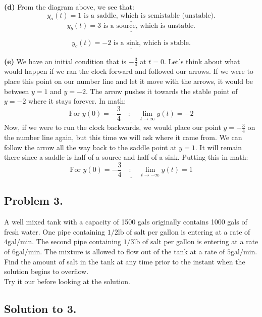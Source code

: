 \documentclass[a4paper,12pt]{article} %
\begin{document}
\textbf{(d)} From the diagram above, we see that:
$$ \underline{\boxed{y_a(t) =1 \text{ is a saddle, which is semistable (unstable).}}} $$
$$ \underline{\boxed{y_b(t) =3 \text{ is a source, which is unstable.}}} $$

$$\underline{\boxed{y_c(t) =-2 \text{ is a sink, which is stable.}}} $$

\textbf{(e)} We have an initial condition that is $-\frac{3}{4}$ at $t=0$. Let's think about what would happen if we ran the clock forward and followed our arrows. If we were to place this point on our number line and let it move with the arrows, it would be between $y=1$ and $y=-2$. The arrow pushes it towards the stable point of $y=-2$ where it stays forever. In math:
$$ \underline{\boxed{\text{For $y(0)=-\frac{3}{4}$}\quad :\quad \lim_{t\to \infty} y(t) = -2}} $$
Now, if we were to run the clock backwards, we would place our point $y=-\frac{3}{4}$ on the number line again, but this time we will ask where it came from. We can follow the arrow all the way back to the saddle point at $y=1$. It will remain there since a saddle is half of a source and half of a sink. Putting this in math:
$$ \underline{\boxed{\text{For $y(0)=-\frac{3}{4}$}\quad:\quad \lim_{t\to -\infty} y(t) = 1}} $$

\pagebreak

\subsection*{Problem 3.}

A well mixed tank with a capacity of 1500 gals originally contains 1000 gals of fresh water. One pipe containing $1 / 2 \mathrm{lb}$ of salt per gallon is entering at a rate of $4 \mathrm{gal} / \mathrm{min}$. The second pipe containing $1 / 3 \mathrm{lb}$ of salt per gallon is entering at a rate of $6 \mathrm{gal} / \mathrm{min}$. The mixture is allowed to flow out of the tank at a rate of $5 \mathrm{gal} / \mathrm{min}$.\\

 Find the amount of salt in the tank at any time prior to the instant when the solution begins to overflow.\\

Try it our before looking at the solution.

\pagebreak

\subsection*{Solution to 3.}
\end{document}
